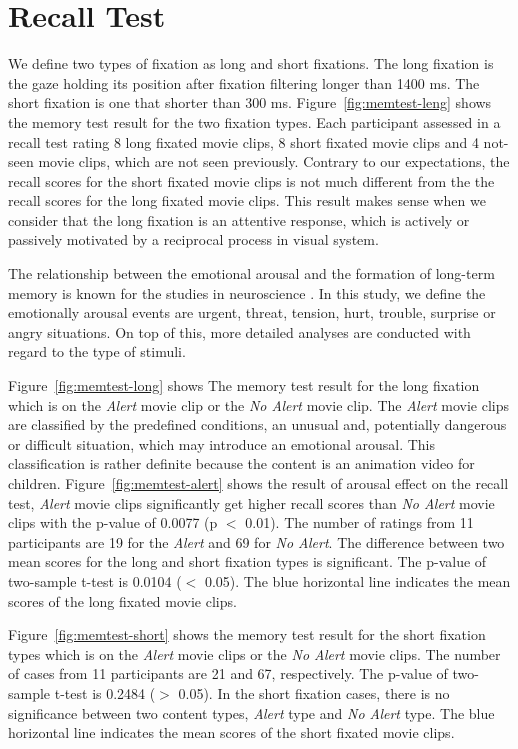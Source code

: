 \documentclass[oneside,master]{snueethesis}
\begin{document}
\section{Recall Test}

We define two types of fixation as long and short fixations. The long fixation is the gaze holding its position after fixation filtering longer than 1400 ms. The short fixation is one that shorter than 300 ms. Figure~\ref{fig:memtest-leng} shows the memory test result for the two fixation types. Each participant assessed in a recall test rating 8 long fixated movie clips, 8 short fixated movie clips and 4 not-seen movie clips, which are not seen previously. Contrary to our expectations, the recall scores for the short fixated movie clips is not much different from the the recall scores for the long fixated movie clips. This result makes sense when we consider that the long fixation is an attentive response, which is actively or passively motivated by a reciprocal process in visual system.

The relationship between the emotional arousal and the formation of long-term memory is known for the studies in neuroscience \cite{Cahill1996amyg,Cahill1998baso}. In this study, we define the emotionally arousal events are urgent, threat, tension, hurt, trouble, surprise or angry situations. On top of this, more detailed analyses are conducted with regard to the type of stimuli.

Figure~\ref{fig:memtest-long} shows The memory test result for the long fixation which is on the \textit{Alert} movie clip or the \textit{No Alert} movie clip. The \textit{Alert} movie clips are classified by the predefined conditions, an unusual and, potentially dangerous or difficult situation, which may introduce an emotional arousal. This classification is rather definite because the content is an animation video for children. Figure~\ref{fig:memtest-alert} shows the result of arousal effect on the recall test, \textit{Alert} movie clips significantly get higher recall scores than \textit{No Alert} movie clips with the p-value of 0.0077 (p $<$ 0.01). The number of ratings from 11 participants are 19 for the \textit{Alert} and 69 for \textit{No Alert}. The difference between two mean scores for the long and short fixation types is significant. The p-value of two-sample t-test is 0.0104 ($<$ 0.05). The blue horizontal line indicates the mean scores of the long fixated movie clips.

Figure~\ref{fig:memtest-short} shows the memory test result for the short fixation types which is on the \textit{Alert} movie clips or the \textit{No Alert} movie clips. The number of cases from 11 participants are 21 and 67, respectively. The p-value of two-sample t-test is 0.2484 ($>$ 0.05). In the short fixation cases, there is no significance between two content types, \textit{Alert} type and \textit{No Alert} type. The blue horizontal line indicates the mean scores of the short fixated movie clips.
\end{document}
